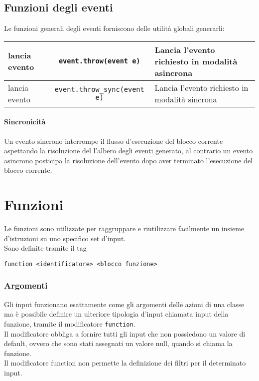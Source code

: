 \subsection{Funzioni degli eventi}
Le funzioni generali degli eventi forniscono delle utilità globali generarli:  
\begin{center}
\begin{tabularx}{\linewidth}{|l|c|X|}
    \hline
    lancia evento & 
    \lstinline|event.throw(event e)|\newline &
    Lancia l'evento richiesto in modalità asincrona \\
    \hline
    lancia evento & 
    \lstinline|event.throw_sync(event e)|\newline &
    Lancia l'evento richiesto in modalità sincrona \\
    \hline
\end{tabularx}
\end{center}

\paragraph*{Sincronicità}
Un evento sincrono interrompe il flusso d'esecuzione del blocco corrente aspettando
la risoluzione del l'albero degli eventi generato, al contrario un evento asincrono
posticipa la risoluzione dell'evento dopo aver terminato l'esecuzione del blocco corrente.


\section{Funzioni}
Le funzioni sono utilizzate per raggruppare e riutilizzare facilmente un insieme d'istruzioni 
su uno specifico set d'input. \\ 
Sono definite tramite il tag 
\begin{lstlisting}
function <identificatore> <blocco funzione>
\end{lstlisting}

\subsubsection{Argomenti} \label{ModificatoreFunction}
Gli input funzionano esattamente come gli argomenti delle azioni di una classe ma è 
possibile definire un ulteriore tipologia d'input chiamata input della funzione,
tramite il modificatore \lstinline|function|. \\
Il modificatore obbliga a fornire tutti gli input che non possiedono un valore di default,
ovvero che sono stati assegnati un valore null, quando si chiama la funzione. \\
Il modificatore function non permette la definizione dei filtri per il determinato input.

